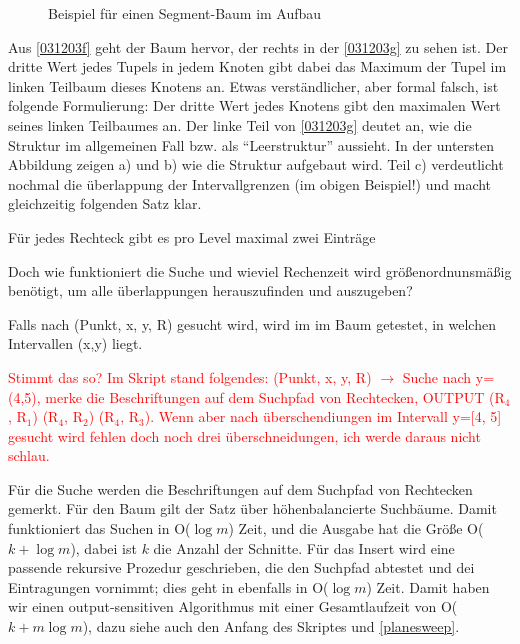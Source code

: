 \begin{figure}[H]
\centering
 \hspace{1cm}  \hspace{1cm} 
\caption{Beispiel für einen Segment-Baum im Aufbau}
\label{031203i}

\end{figure}

Aus \autoref{031203f} geht der Baum hervor, der rechts in der \autoref{031203g} zu sehen ist. Der dritte Wert jedes Tupels
in jedem Knoten
gibt dabei das Maximum der Tupel im linken Teilbaum dieses Knotens an. Etwas verständlicher, aber formal falsch, ist folgende
Formulierung: Der dritte Wert jedes Knotens gibt den maximalen Wert seines linken Teilbaumes an.
Der linke Teil von \autoref{031203g} deutet an, wie die Struktur im allgemeinen Fall bzw. als "`Leerstruktur"' aussieht. In der untersten Abbildung zeigen a) und
b) wie die Struktur aufgebaut wird. Teil c) verdeutlicht nochmal die überlappung der Intervallgrenzen (im obigen Beispiel!) und macht
gleichzeitig folgenden Satz klar.

\begin{satz}
Für jedes Rechteck gibt es pro Level maximal zwei Einträge
\end{satz} 

Doch wie funktioniert die Suche und wieviel Rechenzeit wird größenordnunsmäßig benötigt, um alle überlappungen herauszufinden und
auszugeben?

Falls nach (Punkt, x, y, R) gesucht wird, wird im im Baum getestet, in welchen Intervallen (x,y) liegt. 

\textcolor{red}{Stimmt das so? Im
Skript stand folgendes: (Punkt, x, y, R) $\rightarrow$ Suche nach y=(4,5), merke die Beschriftungen auf dem Suchpfad von Rechtecken,
OUTPUT (R$_4$, R$_1$) (R$_4$, R$_2$) (R$_4$, R$_3$).
Wenn aber nach überschendiungen im Intervall y=[4, 5] gesucht wird fehlen doch noch drei überschneidungen, ich werde daraus nicht
schlau. }

Für die Suche werden die Beschriftungen auf dem Suchpfad von Rechtecken gemerkt. Für den Baum gilt der Satz über höhenbalancierte
Suchbäume. Damit funktioniert das Suchen in O($\log m$) Zeit, und die Ausgabe hat die Größe O($k+ \log m$), dabei ist $k$ die Anzahl
der Schnitte. Für das Insert wird eine passende rekursive Prozedur geschrieben, die den Suchpfad abtestet und dei Eintragungen
vornimmt; dies geht in ebenfalls in O($\log m$) Zeit.
Damit haben wir einen output-sensitiven Algorithmus mit einer Gesamtlaufzeit von O($k +m \log m$), dazu siehe auch den Anfang des
Skriptes und \autoref{planesweep}.

